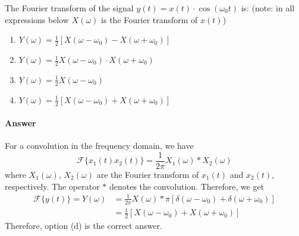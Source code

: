 \documentclass[12pt,a4paper]{article}
\begin{document}
\begin{q}{}
The Fourier transform of the signal $y(t) = x(t) \cdot \cos(\omega_{0}t)$ is: (note: in all expressions below $X(\omega)$ is the Fourier transform of $x(t)$)
\begin{enumerate}[label=(\alph*)]
    \item $Y(\omega) = \frac{1}{2}[X(\omega - \omega_{0}) - X(\omega + \omega_{0})]$
    \item $Y(\omega) = \frac{1}{2}X(\omega - \omega_{0}) \cdot X(\omega + \omega_{0})$
    \item $Y(\omega) = \frac{1}{2}X(\omega - \omega_{0})$
    \item $Y(\omega) = \frac{1}{2}[X(\omega - \omega_{0}) + X(\omega + \omega_{0})]$
\end{enumerate}

\paragraph{Answer}
For a convolution in the frequency domain, we have
\[
    \mathcal{F}\{x_{1}(t) x_{2}(t)\} = \frac{1}{2\pi} X_{1}(\omega) * X_{2}(\omega)
\]
where $X_{1}(\omega)$, $X_{2}(\omega)$ are the Fourier transform of $x_{1}(t)$ and $x_{2}(t)$, respectively. The operator $*$ denotes the convolution. Therefore, we get
\begin{align*}
    \mathcal{F}\{y(t)\} = Y(\omega) 
    & = \frac{1}{2\pi} X(\omega) * \pi[ \delta(\omega - \omega_{0}) +  \delta(\omega + \omega_{0})] \\
    & = \frac{1}{2}[X(\omega - \omega_{0}) + X(\omega + \omega_{0})]
\end{align*}
Therefore, option (d) is the correct answer.
\end{q}
\end{document}
